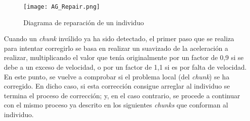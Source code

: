 \documentclass[11pt,spanish,listoffigures,listoftables]{tfgetsinf}
\begin{document}
\begin{figure}[!htb]
    \centering
    \texttt{[image: AG\_Repair.png]}
    \caption{Diagrama de reparación de un individuo}
    \label{fig:adv_repair_diagram}
\end{figure}

Cuando un \textit{chunk} inválido ya ha sido detectado, el primer paso que se realiza para intentar corregirlo se basa en realizar un suavizado de la aceleración a realizar, multiplicando el valor que tenía originalmente por un factor de 0,9 si se debe a un exceso de velocidad, o por un factor de 1,1 si es por falta de velocidad. En este punto, se vuelve a comprobar si el problema local (del \textit{chunk}) se ha corregido. En dicho caso, si esta corrección consigue arreglar al individuo se termina el proceso de corrección; y, en el caso contrario, se procede a continuar con el mismo proceso ya descrito en los siguientes \textit{chunks} que conforman al individuo.
\end{document}
